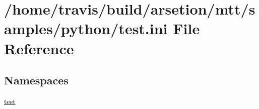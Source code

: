 \hypertarget{test_8ini}{\section{/home/travis/build/arsetion/mtt/samples/python/test.ini File Reference}
\label{test_8ini}
}
\subsection*{Namespaces}
\begin{DoxyCompactItemize}
\item 
\hyperlink{namespacetest}{test}
\end{DoxyCompactItemize}
